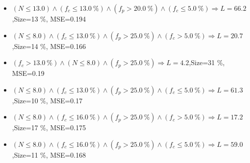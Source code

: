 \documentclass[numbered]{CSL}
\begin{document}
\begin{itemize}
\item $(N \leq 13.0) \land (f_c \leq 13.0~\%) \land (f_p > 20.0~\%) \land (f_c \leq 5.0~\%) \Rightarrow L = 66.2$,\hfill Size=13 \%, MSE=0.194
\item $(N \leq 8.0) \land (f_c \leq 13.0~\%) \land (f_p > 25.0~\%) \land (f_c > 5.0~\%) \Rightarrow L = 20.7$,\hfill Size=14 \%, MSE=0.166
\item $(f_c > 13.0~\%) \land (N \leq 8.0) \land (f_p > 25.0~\%) \Rightarrow L = 4.2$,\hfill Size=31 \%, MSE=0.19
\item $(N \leq 8.0) \land (f_c \leq 13.0~\%) \land (f_p > 25.0~\%) \land (f_c \leq 5.0~\%) \Rightarrow L = 61.3$,\hfill Size=10 \%, MSE=0.17
\item $(N \leq 8.0) \land (f_c \leq 16.0~\%) \land (f_p > 25.0~\%) \land (f_c > 5.0~\%) \Rightarrow L = 17.2$,\hfill Size=17 \%, MSE=0.175
\item $(N \leq 8.0) \land (f_c \leq 16.0~\%) \land (f_p > 25.0~\%) \land (f_c \leq 5.0~\%) \Rightarrow L = 59.0$,\hfill Size=11 \%, MSE=0.168
\end{itemize}
\end{document}
